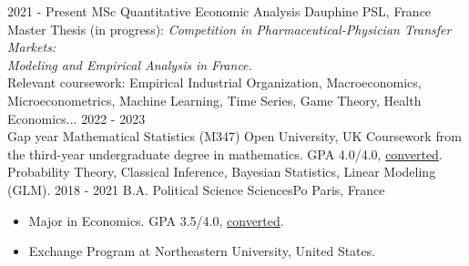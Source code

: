 \documentclass[9pt]{developercv} %
\begin{document}
\vspace{-6 pt}
\begin{entrylist}
    \entry
		{2021 - Present}
		{MSc Quantitative Economic Analysis}
		{Dauphine PSL, France}
		{Master Thesis (in progress): \textit{Competition in Pharmaceutical-Physician Transfer Markets: \\Modeling and Empirical Analysis in France.}\\ Relevant coursework: Empirical Industrial Organization, Macroeconomics, Microeconometrics, Machine Learning, Time Series, Game Theory, Health Economics...}
    \entry
		{2022 - 2023\\\footnotesize{Gap year}}
		{Mathematical Statistics (M347)}
		{Open University, UK}
		{Coursework from the third-year undergraduate degree in mathematics. GPA 4.0/4.0, \href{https://www.scholaro.com/gpa-calculator/UK}{converted}.\\ Probability Theory, Classical Inference, Bayesian Statistics, Linear Modeling (GLM).}
	\entry
		{2018 - 2021}
		{B.A. Political Science}
		{SciencesPo Paris, France}
		{\vspace{-10pt}
             \begin{itemize}[noitemsep,topsep=0pt,parsep=0pt,partopsep=0pt, leftmargin=-1pt]
		    \item Major in Economics. GPA 3.5/4.0, \href{https://www.scholaro.com/gpa-calculator/France}{converted}.
                \item Exchange Program at Northeastern University, United States. 
		\end{itemize}}
\end{entrylist}
\end{document}
